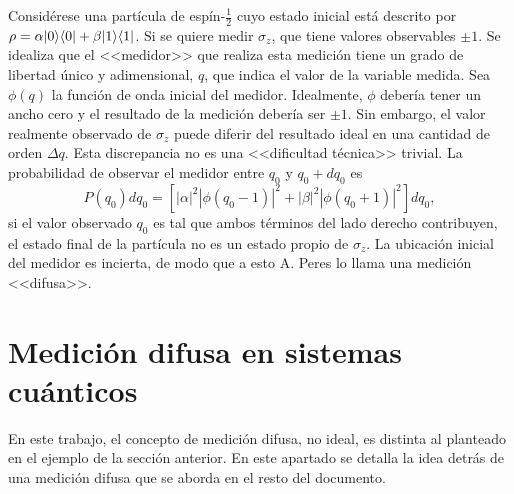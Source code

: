 Considérese una partícula de espín-$\frac{1}{2}$ cuyo estado inicial está descrito por $\rho=\alpha |0\rangle \langle0| + \beta|1\rangle \langle1|$. Si se quiere medir $\sigma_z$, que tiene valores observables $\pm 1$. Se idealiza que el <<medidor>> que realiza esta medición tiene un grado de libertad único y adimensional, $q$, que indica el valor de la variable medida. Sea $\phi(q)$ la función de onda inicial del medidor. %
Idealmente, $\phi$ debería tener un ancho cero y el resultado de la medición debería ser $\pm 1$. Sin embargo, el valor realmente observado de $\sigma_z$ puede diferir del resultado ideal en una cantidad de orden $\Delta q$. Esta discrepancia no es una <<dificultad técnica>> trivial. La probabilidad de observar el medidor entre $q_0$ y $q_0 + d q_0$ es\[P(q_0)dq_0=[|\alpha|^2|\phi(q_0-1)|^2+|\beta|^2|\phi(q_0+1)|^2]dq_0,\]si el valor observado $q_0$ es tal que ambos términos del lado derecho contribuyen, el estado final de la partícula no es un estado propio de $\sigma_z$. La ubicación inicial del medidor es incierta, de modo que  a esto A. Peres lo llama una medición <<difusa>>.   


\section{Medición difusa en sistemas cuánticos}



En este trabajo, el concepto de medición difusa, no ideal,  es distinta al planteado en el ejemplo de la sección anterior.  En este apartado se detalla la idea detrás de una medición difusa que se aborda en el resto del documento.





